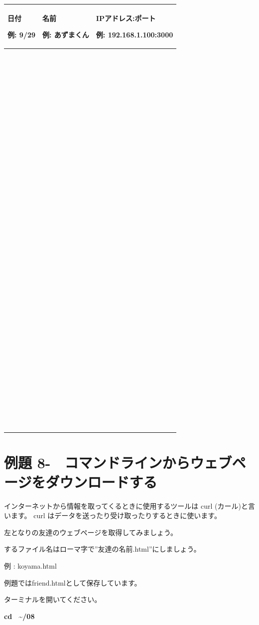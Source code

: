 \documentclass[a4paper,12pt,dvipdfmx]{jarticle}
\newcounter{Exercise}
\renewcommand\theExercise{例題 8-\arabic{Exercise}}
\begin{document}
\begin{center}
\tablefirsthead{}
\tablehead{}
\tabletail{}
\tablelasttail{}
\begin{supertabular}{|m{5.4690003cm}|m{5.4690003cm}|m{5.4690003cm}|}
\hline
日付

例: 9/29 &
名前

例: あずまくん &
IPアドレス:ポート

例: 192.168.1.100:3000\\\hline
~

~

~

~
 &
~
 &
~
\\\hline
~

~

~

~
 &
~
 &
~
\\\hline
~

~

~

~
 &
~
 &
~
\\\hline
~

~

~

~
 &
~
 &
~
\\\hline
~

~

~

~
 &
~
 &
~
\\\hline
\end{supertabular}
\end{center}

\bigskip

\clearpage\section{\theExercise　コマンドラインからウェブページをダウンロードする}
\addtocounter{Exercise}{-1}\label{E:CURL}
インターネットから情報を取ってくるときに使用するツールは
curl (カール)と言います。 curl
はデータを送ったり受け取ったりするときに使います。

左となりの友達のウェブページを取得してみましょう。

するファイル名はローマ字で”友達の名前.html”にしましょう。

例 : koyama.html

例題ではfriend.htmlとして保存しています。

ターミナルを開いてください。

\textbf{cd \ {\textasciitilde}/08}
\end{document}
